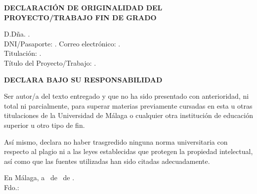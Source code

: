 
\setlength\headheight{75pt}

\begin{center}
    {\fontsize{16}{30}\selectfont \textbf{DECLARACIÓN DE ORIGINALIDAD DEL\\PROYECTO/TRABAJO FIN DE GRADO\\}}
    \bigskip
\end{center}

\begin{flushleft}
    {\fontsize{13}{30}\selectfont D.Dña. \tfgAuthor.\\}
    \bigskip
    {\fontsize{13}{15}\selectfont DNI/Pasaporte: \tfgNIF. Correo electrónico: \tfgEmail.\\}
    \bigskip
    {\fontsize{13}{15}\selectfont Titulación: \tfgGrade.\\}
    \bigskip
    {\fontsize{13}{15}\selectfont Título del Proyecto/Trabajo: \tfgTitle.\\}
    \bigskip
\end{flushleft}

\begin{center}
    {\fontsize{16}{40}\selectfont \textbf{DECLARA BAJO SU RESPONSABILIDAD\\}}
    \bigskip
\end{center}

{\fontsize{13}{40}\selectfont Ser autor/a del texto entregado y que no ha sido presentado con anterioridad, ni total ni parcialmente, para superar materias previamente cursadas en esta u otras titulaciones de la Universidad de Málaga o cualquier otra institución de educación superior u otro tipo de fin.\\}

{\fontsize{13}{15}\selectfont Así mismo, declara no haber trasgredido ninguna norma universitaria con respecto al plagio ni a las leyes establecidas que protegen la propiedad intelectual, así como que las fuentes utilizadas han sido citadas adecuadamente.\\}
\begin{flushright}
    {\fontsize{14}{40}\selectfont En Málaga, a \tfgDay \ de \tfgMonth \ de \tfgYear.\\}
    \vfill
    {\fontsize{14}{30}\selectfont Fdo.: \tfgAuthor}
\end{flushright}

\blankpage